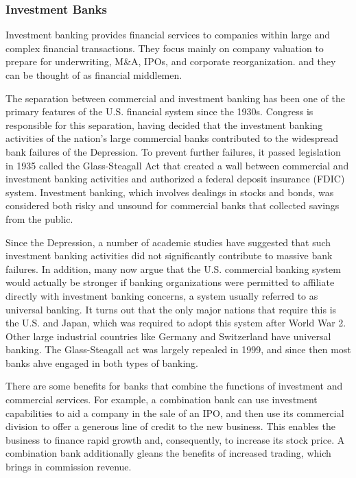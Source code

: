 \documentclass{article}
\begin{document}
    \subsubsection{Investment Banks}

      Investment banking provides financial services to companies within large and complex financial transactions. They focus mainly on company valuation to prepare for underwriting, M\&A, IPOs, and corporate reorganization. and they can be thought of as financial middlemen. 

      The separation between commercial and investment banking has been one of the primary features of the U.S. financial system since the 1930s. Congress is responsible for this separation, having decided that the investment banking activities of the nation's large commercial banks contributed to the widespread bank failures of the Depression. To prevent further failures, it passed legislation in 1935 called the Glass-Steagall Act that created a wall between commercial and investment banking activities and authorized a federal deposit insurance (FDIC) system. Investment banking, which involves dealings in stocks and bonds, was considered both risky and unsound for commercial banks that collected savings from the public.

      Since the Depression, a number of academic studies have suggested that such investment banking activities did not significantly contribute to massive bank failures. In addition, many now argue that the U.S. commercial banking system would actually be stronger if banking organizations were permitted to affiliate directly with investment banking concerns, a system usually referred to as universal banking. It turns out that the only major nations that require this is the U.S. and Japan, which was required to adopt this system after World War 2. Other large industrial countries like Germany and Switzerland have universal banking. The Glass-Steagall act was largely repealed in 1999, and since then most banks ahve engaged in both types of banking. 

      There are some benefits for banks that combine the functions of investment and commercial services. For example, a combination bank can use investment capabilities to aid a company in the sale of an IPO, and then use its commercial division to offer a generous line of credit to the new business. This enables the business to finance rapid growth and, consequently, to increase its stock price. A combination bank additionally gleans the benefits of increased trading, which brings in commission revenue.
\end{document}
